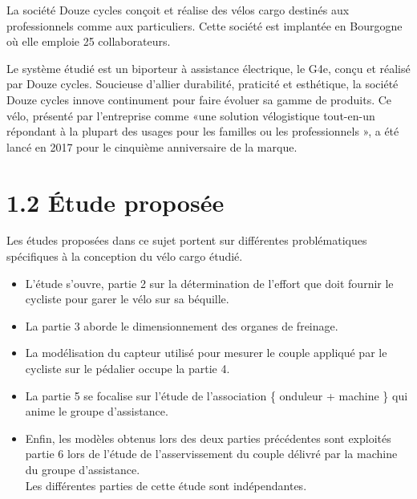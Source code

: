 La société Douze cycles conçoit et réalise des vélos cargo destinés aux professionnels comme aux particuliers. Cette société est implantée en Bourgogne où elle emploie 25 collaborateurs.

Le système étudié est un biporteur à assistance électrique, le G4e, conçu et réalisé par Douze cycles. Soucieuse d'allier durabilité, praticité et esthétique, la société Douze cycles innove continument pour faire évoluer sa gamme de produits. Ce vélo, présenté par l'entreprise comme «une solution vélogistique tout-en-un répondant à la plupart des usages pour les familles ou les professionnels », a été lancé en 2017 pour le cinquième anniversaire de la marque.

\section*{1.2 Étude proposée}
Les études proposées dans ce sujet portent sur différentes problématiques spécifiques à la conception du vélo cargo étudié.

\begin{itemize}
  \item L'étude s'ouvre, partie 2 sur la détermination de l'effort que doit fournir le cycliste pour garer le vélo sur sa béquille.
  \item La partie 3 aborde le dimensionnement des organes de freinage.
  \item La modélisation du capteur utilisé pour mesurer le couple appliqué par le cycliste sur le pédalier occupe la partie 4.
  \item La partie 5 se focalise sur l'étude de l'association \{ onduleur + machine \} qui anime le groupe d'assistance.
  \item Enfin, les modèles obtenus lors des deux parties précédentes sont exploités partie 6 lors de l'étude de l'asservissement du couple délivré par la machine du groupe d'assistance.\\
Les différentes parties de cette étude sont indépendantes.
\end{itemize}


